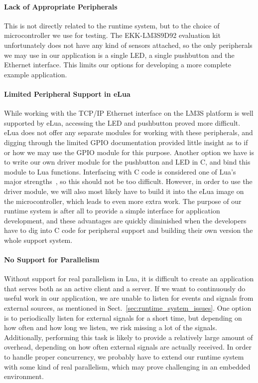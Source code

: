 \paragraph{Lack of Appropriate Peripherals} This is not directly related to the runtime system, but to the choice of microcontroller we use for testing. The EKK-LM3S9D92 evaluation kit unfortunately does not have any kind of sensors attached, so the only peripherals we may use in our application is a single LED, a single pushbutton and the Ethernet interface. This limits our options for developing a more complete example application.

\paragraph{Limited Peripheral Support in eLua} While working with the TCP/IP Ethernet interface on the LM3S platform is well supported by eLua, accessing the LED and pushbutton proved more difficult. eLua does not offer any separate modules for working with these peripherals, and digging through the limited GPIO documentation provided little insight as to if or how we may use the GPIO module for this purpose. Another option we have is to write our own driver module for the pushbutton and LED in C, and bind this module to Lua functions. Interfacing with C code is considered one of Lua's major strengths~\cite{}, so this should not be too difficult. However, in order to use the driver module, we will also most likely have to build it into the eLua image on the microcontroller, which leads to even more extra work. The purpose of our runtime system is after all to provide a simple interface for application development, and these advantages are quickly diminished when the developers have to dig into C code for peripheral support and building their own version the whole support system.

\paragraph{No Support for Parallelism} Without support for real parallelism in Lua, it is difficult to create an application that serves both as an active client and a server. If we want to continuously do useful work in our application, we are unable to listen for events and signals from external sources, as mentioned in Sect.~\ref{sec:runtime_system_issues}. One option is to periodically listen for external signals for a short time, but depending on how often and how long we listen, we risk missing a lot of the signals. Additionally, performing this task is likely to provide a relatively large amount of overhead, depending on how often external signals are actually received. In order to handle proper concurrency, we probably have to extend our runtime system with some kind of real parallelism, which may prove challenging in an embedded environment.

